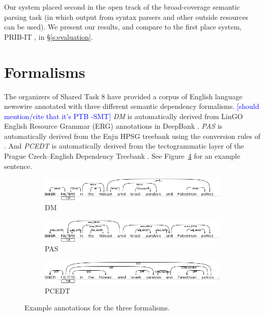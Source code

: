 \documentclass[11pt]{article}
\newcommand{\sam}[1]{\textcolor{blue}{[#1 -SMT]}}
\begin{document}
Our system placed second in the open track of the broad-coverage semantic
parsing task (in which output from syntax parsers and other outside resources can be used).
We present our results, and compare to the first place system, PRIB-IT
\cite{martins_prib_2014}, in \S\ref{s:evaluation}.



\section{Formalisms} \label{s:formalisms}

The organizers of Shared Task 8 have provided a corpus of English language
newswire annotated with three different semantic dependency formalisms.
\sam{should mention/cite that it's PTB}
\emph{DM} is automatically derived from LinGO English Resource Grammar (ERG)
annotations in DeepBank \cite{flickinger_deepbank_2012}.
\emph{PAS} is automatically derived from the Enju HPSG treebank using the
conversion rules of .
And \emph{PCEDT} is automatically derived from the tectogrammatic layer of the
Prague Czech--English Dependency Treebank \cite{hajic_building_1998}.
See Figure~\ref{fig:formalisms} for an example sentence.
\begin{figure}
	\centering
	\begin{subfigure}{0.7\textwidth}
		\includegraphics[width=\textwidth]{fig/example_dm}
		\caption{DM}
		\label{fig:dm}
	\end{subfigure}
	\begin{subfigure}{0.7\textwidth}
		\includegraphics[width=\textwidth]{fig/example_pas}
		\caption{PAS}
		\label{fig:pas}
	\end{subfigure}
	\begin{subfigure}{0.7\textwidth}
		\includegraphics[width=\textwidth]{fig/example_pcedt}
		\caption{PCEDT}
		\label{fig:pcedt}
	\end{subfigure}
	\caption{Example annotations for the three formalisms.}
	\label{fig:formalisms}
\end{figure}
\end{document}
